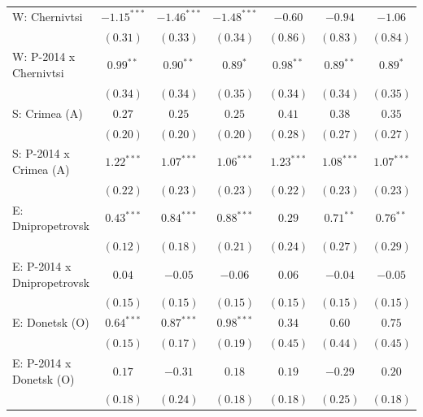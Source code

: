 \begin{table}
\begin{center}
\begin{small}
\begin{tabular}{l c c c c c c}
W: Chernivtsi               & $-1.15^{***}$ & $-1.46^{***}$ & $-1.48^{***}$ & $-0.60$      & $-0.94$      & $-1.06$      \\
                            & $(0.31)$      & $(0.33)$      & $(0.34)$      & $(0.86)$     & $(0.83)$     & $(0.84)$     \\
W: P-2014 x Chernivtsi      & $0.99^{**}$   & $0.90^{**}$   & $0.89^{*}$    & $0.98^{**}$  & $0.89^{**}$  & $0.89^{*}$   \\
                            & $(0.34)$      & $(0.34)$      & $(0.35)$      & $(0.34)$     & $(0.34)$     & $(0.35)$     \\
S: Crimea (A)               & $0.27$        & $0.25$        & $0.25$        & $0.41$       & $0.38$       & $0.35$       \\
                            & $(0.20)$      & $(0.20)$      & $(0.20)$      & $(0.28)$     & $(0.27)$     & $(0.27)$     \\
S: P-2014 x Crimea (A)      & $1.22^{***}$  & $1.07^{***}$  & $1.06^{***}$  & $1.23^{***}$ & $1.08^{***}$ & $1.07^{***}$ \\
                            & $(0.22)$      & $(0.23)$      & $(0.23)$      & $(0.22)$     & $(0.23)$     & $(0.23)$     \\
E: Dnipropetrovsk           & $0.43^{***}$  & $0.84^{***}$  & $0.88^{***}$  & $0.29$       & $0.71^{**}$  & $0.76^{**}$  \\
                            & $(0.12)$      & $(0.18)$      & $(0.21)$      & $(0.24)$     & $(0.27)$     & $(0.29)$     \\
E: P-2014 x Dnipropetrovsk  & $0.04$        & $-0.05$       & $-0.06$       & $0.06$       & $-0.04$      & $-0.05$      \\
                            & $(0.15)$      & $(0.15)$      & $(0.15)$      & $(0.15)$     & $(0.15)$     & $(0.15)$     \\
E: Donetsk (O)              & $0.64^{***}$  & $0.87^{***}$  & $0.98^{***}$  & $0.34$       & $0.60$       & $0.75$       \\
                            & $(0.15)$      & $(0.17)$      & $(0.19)$      & $(0.45)$     & $(0.44)$     & $(0.45)$     \\
E: P-2014 x Donetsk (O)     & $0.17$        & $-0.31$       & $0.18$        & $0.19$       & $-0.29$      & $0.20$       \\
                            & $(0.18)$      & $(0.24)$      & $(0.18)$      & $(0.18)$     & $(0.25)$     & $(0.18)$     \\

\end{tabular}
\end{small}
\end{center}
\end{table}
